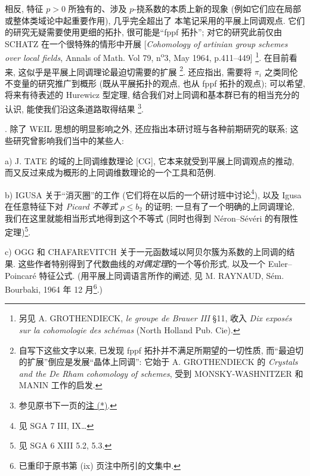 相反, 特征 $p>0$ 所独有的、涉及 $p$-挠系数的本质上新的现象
(例如它们应在局部或整体类域论中起重要作用),
几乎完全超出了
本笔记采用的平展上同调观点.
它们的研究无疑需要使用更细的拓扑,
很可能是“fppf 拓扑”; 对它的研究此前仅由 SCHATZ 在一个很特殊的情形中开展
[\textit{Cohomology of artinian group schemes over local fields},
Annals of Math. Vol 79, n\textsuperscript{o}3, May 1964, p.411--449]
\begingroup\renewcommand{\thefootnote}{\fnsymbol{footnote}}
\footnote[1]{另见 A. GROTHENDIECK, \textit{le groupe de Brauer III} §11,
收入 \textit{Dix exposés sur la cohomologie des schémas} (North Holland Pub. Cie).}.
在目前看来, 这似乎是平展上同调理论最迫切需要的扩展
\footnote[2]{自写下这些文字以来, 已发现 fppf 拓扑并不满足所期望的一切性质,
而“最迫切的扩展”倒应是发展“晶体上同调”:
它始于 A. GROTHENDIECK 的 \textit{Crystals and the De Rham cohomology of schemes},
受到 MONSKY-WASHNITZER 和 MANIN 工作的启发.}.
还应指出, 需要将 $\pi_i$ 之类同伦不变量的研究推广到概形
(既从平展拓扑的观点, 也从 fppf 拓扑的观点);
可以希望, 将来有待表述的 Hurewicz 型定理,
结合我们对上同调和基本群已有的相当充分的认识,
能使我们沿这条道路取得结果
\footnote[3]{参见原书下一页的\hyperlink{frontprefaces.homotopy-note}{注 (*)}.}.
\par\endgroup

. 除了 WEIL 思想的明显影响之外,
还应指出本研讨班与各种前期研究的联系;
这些研究曾影响我们当中的某些人:

\noindent a) J. TATE 的域的上同调维数理论 [CG],
它本来就受到平展上同调观点的推动,
而又反过来成为概形的上同调维数理论的一个工具和范例.

\begingroup\renewcommand{\thefootnote}{\fnsymbol{footnote}}

\noindent b) IGUSA 关于“消灭圈”的工作
(它们将在以后的一个研讨班中讨论\footnote[2]{见 SGA 7 III, IX\ldots}),
以及 Igusa 在任意特征下对 \emph{Picard 不等式} $\rho\leq b_2$ 的证明;
一旦有了一个明确的上同调理论,
我们在这里就能相当形式地得到这个不等式
(同时也得到 Néron--Sévéri 的有限性定理)\footnote[3]{见 SGA 6 XIII 5.2, 5.3.}.

\noindent c) OGG 和 CHAFAREVITCH 关于一元函数域以阿贝尔簇为系数的上同调的结果.
这些作者特别得到了代数曲线的\emph{对偶定理}的一个等价形式,
以及一个 Euler--Poincaré 特征公式.
(用平展上同调语言所作的阐述, 见 M. RAYNAUD,
Sém. Bourbaki, 1964 年 12 月\footnote[4]{已重印于原书第 (ix) 页注中所引的文集中.}.)
\par\endgroup

